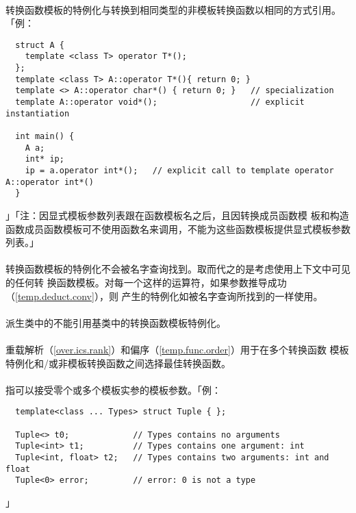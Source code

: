\paragraph{}
转换函数模板的特例化与转换到相同类型的非模板转换函数以相同的方式引用。「例：
\begin{lstlisting}
  struct A {
    template <class T> operator T*();
  };
  template <class T> A::operator T*(){ return 0; }
  template <> A::operator char*() { return 0; }   // specialization
  template A::operator void*();                   // explicit instantiation

  int main() {
    A a;
    int* ip;
    ip = a.operator int*();   // explicit call to template operator A::operator int*()
  }
\end{lstlisting}」「注：因显式模板参数列表跟在函数模板名之后，且因转换成员函数模
板和构造函数成员函数模板可不使用函数名来调用，不能为这些函数模板提供显式模板参数
列表。」

\paragraph{}
转换函数模板的特例化不会被名字查询找到。取而代之的是考虑使用上下文中可见的任何转
换函数模板。对每一个这样的运算符，如果参数推导成功（\ref{temp.deduct.conv}），则
产生的特例化如被名字查询所找到的一样使用。

\paragraph{}
派生类中的不能引用基类中的转换函数模板特例化。

\paragraph{}
重载解析（\ref{over.ics.rank}）和偏序（\ref{temp.func.order}）用于在多个转换函数
模板特例化和/或非模板转换函数之间选择最佳转换函数。

\paragraph{}
指可以接受零个或多个模板实参的模板参数。「例：
\begin{lstlisting}
  template<class ... Types> struct Tuple { };

  Tuple<> t0;             // Types contains no arguments
  Tuple<int> t1;          // Types contains one argument: int
  Tuple<int, float> t2;   // Types contains two arguments: int and float
  Tuple<0> error;         // error: 0 is not a type
\end{lstlisting}」

